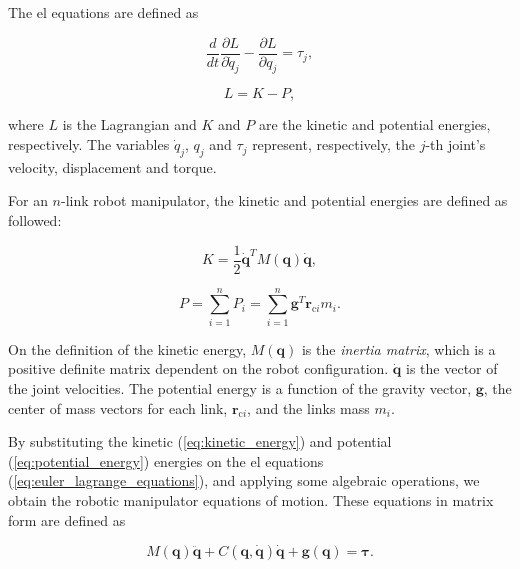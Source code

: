 The \gls{el} equations are defined as

\begin{equation}
    \label{eq:euler_lagrange_equations}
    \frac{d}{dt}\frac{\partial L}{\partial\dot{q}_j}-\frac{\partial L}{\partial q_j} = \tau_j ,
\end{equation}

\begin{equation}
    L = K - P,
\end{equation}

where $L$ is the Lagrangian and $K$ and $P$ are the kinetic and potential energies, respectively. The variables $\dot{q}_j$, $q_j$ and $\tau_j$ represent, respectively, the $j$-th joint's velocity, displacement and torque.

For an $n$-link robot manipulator, the kinetic and potential energies are defined as followed:

\begin{equation}
    \label{eq:kinetic_energy}
    K = \frac{1}{2}\dot{\boldsymbol{q}}^T M(\boldsymbol{q}) \dot{\boldsymbol{q}},
\end{equation}

\begin{equation}
    \label{eq:potential_energy}
    P = \sum^{n}_{i=1} P_i = \sum^{n}_{i=1} \boldsymbol{g}^T \boldsymbol{r}_{\text{c}i} m_i .
\end{equation}

On the definition of the kinetic energy, $M(\boldsymbol{q})$ is the \emph{inertia matrix}, which is a positive definite matrix dependent on the robot configuration. $\dot{\boldsymbol{q}}$ is the vector of the joint velocities.
The potential energy is a function of the gravity vector, $\boldsymbol{g}$, the center of mass vectors for each link, $\boldsymbol{r}_{\text{c}i}$, and the links mass $m_i$.

By substituting the kinetic (\ref{eq:kinetic_energy}) and potential (\ref{eq:potential_energy}) energies on the \gls{el} equations (\ref{eq:euler_lagrange_equations}), and applying some algebraic operations, we obtain the robotic manipulator equations of motion. These equations in matrix form are defined as

\begin{equation}
    \label{eq:equations_motion}
    M(\boldsymbol{q})\ddot{\boldsymbol{q}} + C(\boldsymbol{q}, \dot{\boldsymbol{q}})\dot{\boldsymbol{q}} + \boldsymbol{g}(\boldsymbol{q}) = \boldsymbol{\tau}.
\end{equation}

